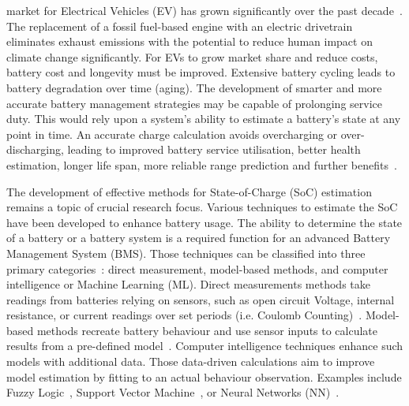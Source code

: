  market for Electrical Vehicles (EV) has grown significantly over the past decade~\cite{state-ev-australia}.
The replacement of a fossil fuel-based engine with an electric drivetrain eliminates exhaust emissions with the potential to reduce human impact on climate change significantly.
For EVs to grow market share and reduce costs, battery cost and longevity must be improved.
Extensive battery cycling leads to battery degradation over time (aging).
The development of smarter and more accurate battery management strategies may be capable of prolonging service duty.
This would rely upon a system's ability to estimate a battery's state at any point in time.
An accurate charge calculation avoids overcharging or over-discharging, leading to improved battery service utilisation, better health estimation, longer life span, more reliable range prediction and further benefits~\cite{calif_proper_2008}.

%
%
The development of effective methods for State-of-Charge (SoC) estimation remains a topic of crucial research focus.
Various techniques to estimate the SoC have been developed to enhance battery usage.
The ability to determine the state of a battery or a battery system is a required function for an advanced Battery Management System (BMS).
Those techniques can be classified into three primary categories~\cite{ali_towards_2019,ng_enhanced_2009,robust_SoC,6953745}: direct measurement, model-based methods, and computer intelligence or Machine Learning (ML).
Direct measurements methods take readings from batteries relying on sensors, such as open circuit Voltage, internal resistance, or current readings over set periods (i.e. Coulomb Counting)~\cite{ng_enhanced_2009,robust_SoC}.
Model-based methods recreate battery behaviour and use sensor inputs to calculate results from a pre-defined model~\cite{6953745}.
Computer intelligence techniques enhance such models with additional data.
Those data-driven calculations aim to improve model estimation by fitting to an actual behaviour observation.
Examples include Fuzzy Logic~\cite{malkhandi_fuzzy_2006}, Support Vector Machine~\cite{hansen_support_2005, anton_battery_2013}, or Neural Networks (NN)~\cite{song_lithium-ion_2018,Chemali2017,mamo_long_2020,jiao_gru-rnn_2020,xiao_accurate_2019,javid_adaptive_2020,zhang_deep_2020}.

